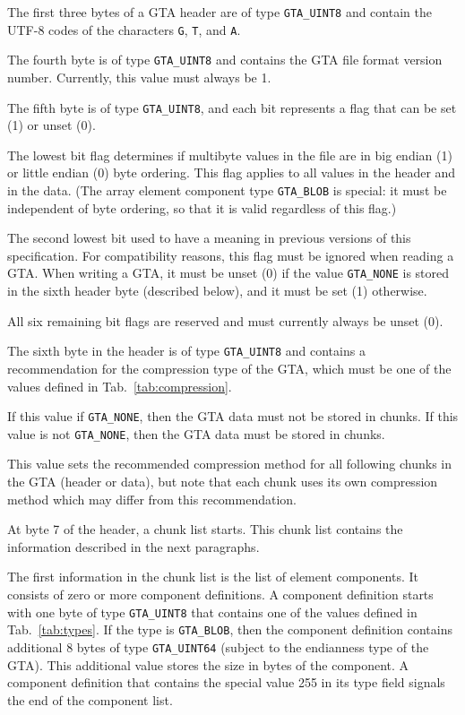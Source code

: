 \documentclass[a4paper,11pt]{article}
\newcommand{\code}[1]{\texttt{#1}}
\begin{document}
The first three bytes of a GTA header are of type \code{GTA\_UINT8} and contain
the \mbox{UTF-8} codes of the characters \code{G}, \code{T}, and \code{A}.

The fourth byte is of type \code{GTA\_UINT8} and contains the GTA file format
version number. Currently, this value must always be 1.

The fifth byte is of type \code{GTA\_UINT8}, and each bit represents a flag that
can be set (1) or unset (0).

The lowest bit flag determines if multibyte values in the file are in big endian
(1) or little endian (0) byte ordering. This flag applies to all values in the
header and in the data. (The array element component type \code{GTA\_BLOB} is special:
it must be independent of byte ordering, so that it is valid regardless of this
flag.)

The second lowest bit used to have a meaning in previous versions of this
specification. For compatibility reasons, this flag must be ignored when
reading a GTA. When writing a GTA, it must be unset (0) if the value
\code{GTA\_NONE} is stored in the sixth header byte (described below), and it
must be set (1) otherwise.

All six remaining bit flags are reserved and must currently always be unset (0).

The sixth byte in the header is of type \code{GTA\_UINT8} and contains a
recommendation for the compression type of the GTA, which must be one of the
values defined in Tab.~\ref{tab:compression}.

If this value if \code{GTA\_NONE}, then the GTA data must not be stored in
chunks. If this value is not \code{GTA\_NONE}, then the GTA data must be stored
in chunks.

This value sets the recommended compression method for all following chunks
in the GTA (header or data), but note that each chunk uses its own compression
method which may differ from this recommendation.

At byte 7 of the header, a chunk list starts. This chunk list contains the
information described in the next paragraphs.

The first information in the chunk list is the list of element components. It
consists of zero or more component definitions. A component definition starts
with one byte of type \code{GTA\_UINT8} that contains one of the values
defined in Tab.~\ref{tab:types}. If the type is \code{GTA\_BLOB}, then the
component definition contains additional 8 bytes of type \code{GTA\_UINT64}
(subject to the endianness type of the GTA). This additional value stores the
size in bytes of the component. A component definition that contains the
special value 255 in its type field signals the end of the component list.
\end{document}
